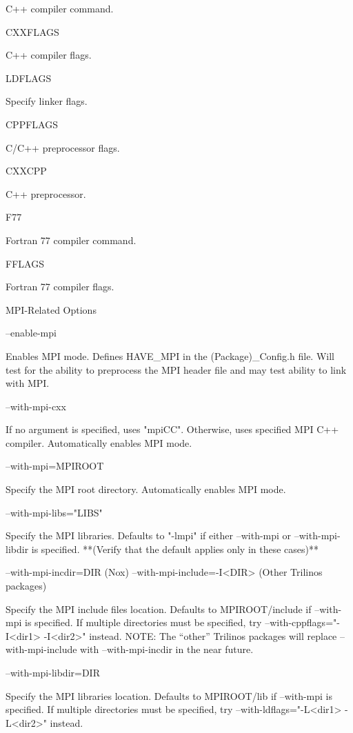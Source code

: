 \documentclass[12pt,relax]{TrilinosDevGuide}
\begin{document}
C++ compiler command.

\bullet CXXFLAGS 

C++ compiler flags.

\bullet LDFLAGS 

Specify linker flags.

\bullet CPPFLAGS 

C/C++ preprocessor flags.

\bullet CXXCPP 

C++ preprocessor.

\bullet F77 

Fortran 77 compiler command.

\bullet FFLAGS 

Fortran 77 compiler flags.

\triangleright MPI-Related Options

\bullet --enable-mpi 

Enables MPI mode. Defines HAVE_MPI in the (Package)_Config.h file. Will test 
for the ability to preprocess the MPI header file and may test ability to link 
with MPI.

\bullet --with-mpi-cxx 

If no argument is specified, uses "mpiCC". Otherwise, uses specified MPI C++ 
compiler. Automatically enables MPI mode. 

\bullet --with-mpi=MPIROOT 

Specify the MPI root directory. Automatically enables MPI mode. 

\bullet --with-mpi-libs="LIBS" 

Specify the MPI libraries. Defaults to "-lmpi" if either --with-mpi or 
--with-mpi-libdir is specified. **(Verify that the default applies only in these cases)**

\bullet --with-mpi-incdir=DIR (Nox)
\bullet --with-mpi-include=-I<DIR> (Other Trilinos packages)

Specify the MPI include files location. Defaults to MPIROOT/include if 
--with-mpi is specified. If multiple directories  must be specified, try 
--with-cppflags="-I<dir1> -I<dir2>" instead.  NOTE: The ``other'' Trilinos 
packages will replace --with-mpi-include with --with-mpi-incdir in the near
future.

\bullet --with-mpi-libdir=DIR 

Specify the MPI libraries location. Defaults to MPIROOT/lib if --with-mpi is 
specified. If multiple directories must be specified, try 
--with-ldflags="-L<dir1> -L<dir2>" instead. 
\end{document}
